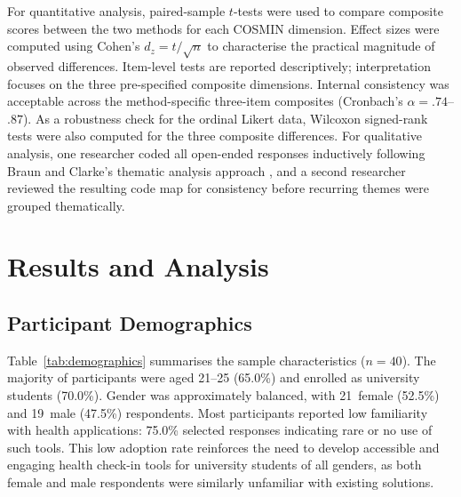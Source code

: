 \documentclass[conference]{IEEEtran}
\begin{document}
For quantitative analysis, paired-sample $t$-tests were used to compare
composite scores between the two methods for each COSMIN dimension. Effect
sizes were computed using Cohen's $d_z = t / \sqrt{n}$ \cite{lakens2013} to
characterise the practical magnitude of observed differences. Item-level
tests are reported descriptively; interpretation focuses on the three
pre-specified composite dimensions. Internal consistency was acceptable
across the method-specific three-item composites (Cronbach's
$\alpha=.74$--$.87$). As a robustness check for the ordinal Likert data,
Wilcoxon signed-rank tests were also computed for the three composite
differences. For qualitative
analysis, one researcher coded all open-ended responses inductively
following Braun and Clarke's thematic analysis approach \cite{braun2006},
and a second researcher reviewed the resulting code map for consistency
before recurring themes were grouped thematically.

\section{Results and Analysis}
\label{sec:results}

\subsection{Participant Demographics}
\label{subsec:demographics}

Table~\ref{tab:demographics} summarises the sample characteristics
($n=40$).
The majority of participants were aged 21--25 (65.0\%) and enrolled as
university students (70.0\%). Gender was approximately balanced, with
21~female (52.5\%) and 19~male (47.5\%) respondents. Most participants
reported low familiarity with health applications: 75.0\% selected
responses indicating rare or no use of such tools. This low adoption
rate reinforces the need to develop accessible and engaging health
check-in tools for university students of all genders, as both female
and male respondents were similarly unfamiliar with existing solutions.
\end{document}

